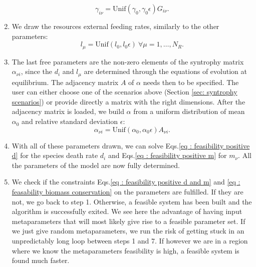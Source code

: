 \documentclass[12pt, titlepage]{report}
\begin{document}
\begin{enumerate}
  \begin{equation}
    \gamma_{i\nu} = \text{Unif}(\gamma_0, \gamma_0\epsilon) G_{i\nu}.
  \end{equation}
  \item We draw the resources external feeding rates, similarly to the other parameters:
  \begin{equation}
  l_\mu = \text{Unif}(l_0, l_0\epsilon) \ \forall \mu=1, \dots, N_R.
  \end{equation}
  \item The last free parameters are the non-zero elements of the syntrophy matrix $\alpha_{\nu i}$, since the $d_i$ and $l_\mu$ are determined through the equations of evolution at equilibrium. %
  The adjacency matrix $A$ of $\alpha$ needs then to be specified. The user can either choose one of the scenarios above (Section \ref{sec: syntrophy scenarios}) or provide directly a matrix with the right dimensions. After the adjacency matrix is loaded, we build $\alpha$ from a uniform distribution of mean $\alpha_0$ and relative standard deviation $\epsilon$:
  \begin{equation}
    \alpha_{\nu i} = \text{Unif}(\alpha_0, \alpha_0\epsilon) A_{\nu i} .
  \end{equation}
  \item With all of these parameters drawn, we can solve Eqs.\eqref{eq : feasibility positive d} for the species death rate $d_i$ and Eqs.\eqref{eq : feasibility positive m} for $m_\nu$. All the parameters of the model are now fully determined.
  \item We check if the constraints Eqs.\eqref{eq : feasibility positive d and m} and \eqref{eq : feasability biomass conservation} on the parameters are fulfilled. If they are not, we go back to step 1. Otherwise, a feasible system has been built and the algorithm is successfully exited. We see here the advantage of having input metaparameters that will most likely give rise to a feasible parameter set. If we just give random metaparameters, we run the risk of getting stuck in an unpredictably long loop between steps 1 and 7. If however we are in a region where we know the metaparameters feasibility is high, a feasible system is found much faster.
\end{enumerate}
\end{document}

